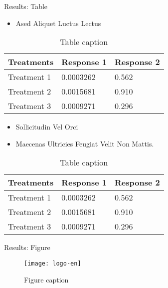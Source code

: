 \documentclass[final,hyperref={pdfpagelabels=false}]{beamer}
\begin{document}
\begin{frame}[t]
\begin{columns}[t]
\begin{column}{.465\textwidth}

\begin{block}{Results: Table}

\begin{itemize}
\item Ased Aliquet Luctus Lectus
\end{itemize}

\begin{table}
\begin{tabular}{l l l}
\toprule
\textbf{Treatments} & \textbf{Response 1} & \textbf{Response 2}\\
\midrule
Treatment 1 & 0.0003262 & 0.562 \\
Treatment 2 & 0.0015681 & 0.910 \\
Treatment 3 & 0.0009271 & 0.296 \\
\bottomrule
\end{tabular}
\caption{Table caption}
\end{table}

\begin{itemize}
\item Sollicitudin Vel Orci
\item Maecenas Ultricies Feugiat Velit Non Mattis.
\end{itemize}

\begin{table}
\begin{tabular}{l l l}
\toprule
\textbf{Treatments} & \textbf{Response 1} & \textbf{Response 2}\\
\midrule
Treatment 1 & 0.0003262 & 0.562 \\
Treatment 2 & 0.0015681 & 0.910 \\
Treatment 3 & 0.0009271 & 0.296 \\
\bottomrule
\end{tabular}
\caption{Table caption}
\end{table}
     
\end{block}


\begin{block}{Results: Figure}

\begin{figure}
\texttt{[image: logo-en]}
\caption{Figure caption}
\end{figure}


\end{block}
\end{column}
\end{columns}
\end{frame}
\end{document}
